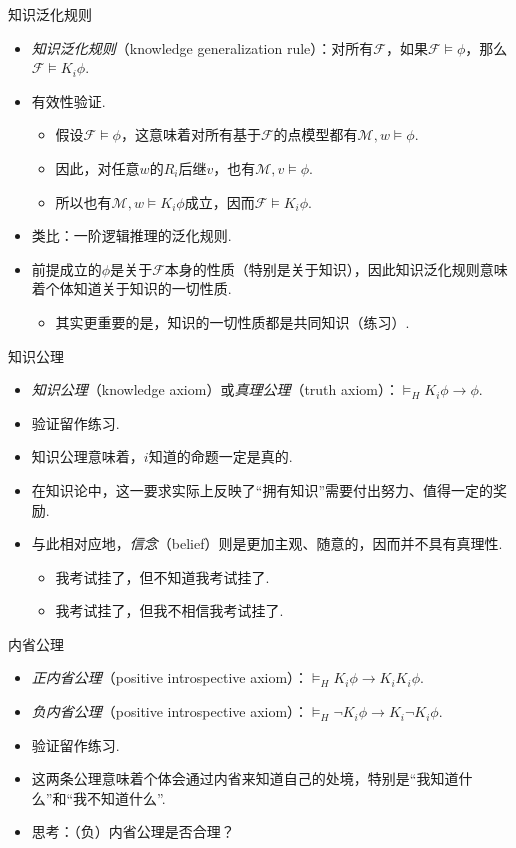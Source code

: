 {知识泛化规则}
\begin{itemize}
    \item \emph{知识泛化规则}（knowledge generalization rule）：对所有$\mathcal F$，如果$\mathcal F\vDash\phi$，那么$\mathcal F\vDash K_i\phi$.
    \item 有效性验证.
    \begin{itemize}
        \item 假设$\mathcal F\vDash\phi$，这意味着对所有基于$\mathcal F$的点模型都有$\mathcal M,w\vDash\phi$.
        \item 因此，对任意$w$的$R_i$后继$v$，也有$\mathcal M,v\vDash\phi$.
        \item 所以也有$\mathcal M,w\vDash K_i\phi$成立，因而$\mathcal F\vDash K_i\phi$.
    \end{itemize}
    \item 类比：一阶逻辑推理的泛化规则.
    \item 前提成立的$\phi$是关于$\mathcal F$本身的性质（特别是关于知识），因此知识泛化规则意味着个体知道关于知识的一切性质.
    \begin{itemize}
        \item 其实更重要的是，知识的一切性质都是共同知识（练习）.%
    \end{itemize}
\end{itemize}


{知识公理}
\begin{itemize}
    \item \emph{知识公理}（knowledge axiom）或\emph{真理公理}（truth axiom）：$\vDash_H K_i\phi\to\phi$.
    \item 验证留作练习. %
    \item 知识公理意味着，$i$知道的命题一定是真的.
    \item 在知识论中，这一要求实际上反映了“拥有知识”需要付出努力、值得一定的奖励.
    \item 与此相对应地，\emph{信念}（belief）则是更加主观、随意的，因而并不具有真理性.
    \begin{itemize}
        \item 我考试挂了，但不知道我考试挂了.
        \item 我考试挂了，但我不相信我考试挂了.
    \end{itemize}
\end{itemize}

{内省公理}
\begin{itemize}
    \item \emph{正内省公理}（positive introspective axiom）：$\vDash_H K_i\phi\to K_iK_i\phi$.
    \item \emph{负内省公理}（positive introspective axiom）：$\vDash_H \neg K_i\phi\to K_i\neg K_i\phi$.
    \item 验证留作练习. %
    \item 这两条公理意味着个体会通过内省来知道自己的处境，特别是“我知道什么”和“我不知道什么”.
    \item 思考：（负）内省公理是否合理？
\end{itemize}

